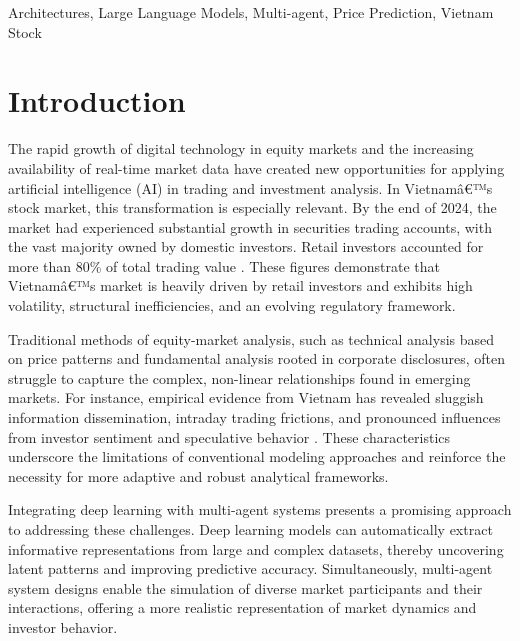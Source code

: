 \documentclass{ieeeaccess}
\begin{document}
\begin{keywords}
Architectures, Large Language Models, Multi-agent, Price Prediction, Vietnam Stock
\end{keywords}

\titlepgskip=-21pt

\maketitle

\section{Introduction}
\label{sec:introduction}
The rapid growth of digital technology in equity markets and the increasing availability of real-time market data  have created new opportunities for applying artificial intelligence (AI) in trading and investment analysis. In Vietnamâ€™s stock market, this transformation is especially relevant. By the end of 2024, the market had experienced substantial growth in securities trading accounts, with the vast majority owned by domestic investors. Retail investors accounted for more than 80\% of total trading value \cite{vietnamnews2025}. These figures demonstrate that Vietnamâ€™s market is heavily driven by retail investors and exhibits high volatility, structural inefficiencies, and an evolving regulatory framework.

Traditional methods of equity-market analysis, such as technical analysis based on price patterns and fundamental analysis rooted in corporate disclosures, often struggle to capture the complex, non-linear relationships found in emerging markets. For instance, empirical evidence from Vietnam has revealed sluggish information dissemination, intraday trading frictions, and pronounced influences from investor sentiment and speculative behavior \cite{ha2025}. These characteristics underscore the limitations of conventional modeling approaches and reinforce the necessity for more adaptive and robust analytical frameworks.

Integrating deep learning with multi-agent systems presents a promising approach to addressing these challenges. Deep learning models can automatically extract informative representations from large and complex datasets, thereby uncovering latent patterns and improving predictive accuracy. Simultaneously, multi-agent system designs enable the simulation of diverse market participants and their interactions, offering a more realistic representation of market dynamics and investor behavior.
\end{document}

